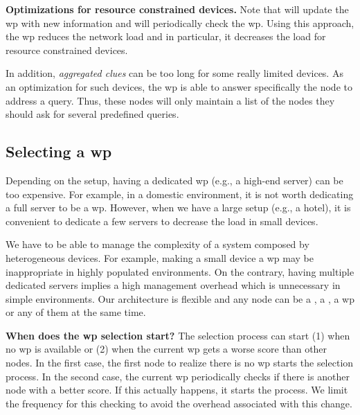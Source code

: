 \noindent\textbf{Optimizations for resource constrained devices.}
Note that \providers{} will update the \ac{wp} with new information and \consumers{} will periodically check the \ac{wp}.
Using this approach, the \ac{wp} reduces the network load and in particular, it decreases the load for resource constrained devices.

In addition, \emph{aggregated clues} can be too long for some really limited devices.
As an optimization for such devices, the \ac{wp} is able to answer specifically the node to address a query.
Thus, these nodes will only maintain a list of the nodes they should ask for several predefined queries.



\subsection{Selecting a \acl{wp}}
\label{sec:selection}
Depending on the setup, having a dedicated \ac{wp} (e.g., a high-end server) can be too expensive.
For example, in a domestic environment, it is not worth dedicating a full server to be a \ac{wp}.
However, when we have a large setup (e.g., a hotel), it is convenient to dedicate a few servers to decrease the load in small devices.

We have to be able to manage the complexity of a system composed by heterogeneous devices.
For example, making a small device a \ac{wp} may be inappropriate in highly populated environments.
On the contrary, having multiple dedicated servers implies a high management overhead which is unnecessary in simple environments.
Our architecture is flexible and any node can be a \provider{}, a \consumer{}, a \ac{wp} or any of them at the same time.

\noindent\textbf{When does the \ac{wp} selection start?}
The selection process can start (1) when no \ac{wp} is available or (2) when the current \ac{wp} gets a worse score than other nodes.
In the first case, the first node to realize there is no \ac{wp} starts the selection process.
In the second case, the current \ac{wp} periodically checks if there is another node with a better score.
If this actually happens, it starts the process.
We limit the frequency for this checking to avoid the overhead associated with this change.

